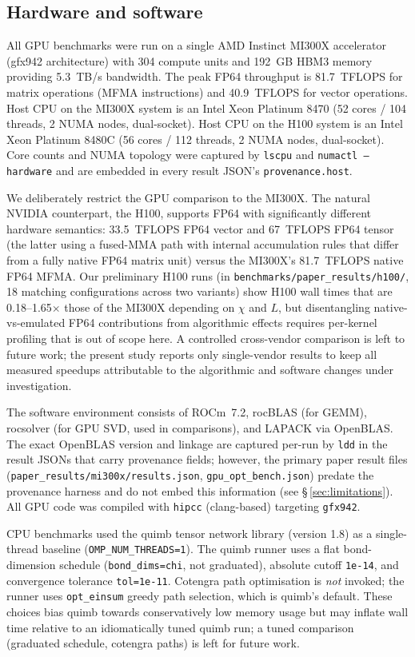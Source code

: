\documentclass[preprint,12pt]{elsarticle}
\begin{document}
\subsection{Hardware and software}
\label{sec:hardware}

All GPU benchmarks were run on a single AMD Instinct MI300X accelerator (gfx942 architecture) with 304 compute units and 192~GB HBM3 memory providing 5.3~TB/s bandwidth.
The peak FP64 throughput is 81.7~TFLOPS for matrix operations (MFMA instructions) and 40.9~TFLOPS for vector operations.
Host CPU on the MI300X system is an Intel Xeon Platinum 8470 (52 cores / 104 threads, 2 NUMA nodes, dual-socket). Host CPU on the H100 system is an Intel Xeon Platinum 8480C (56 cores / 112 threads, 2 NUMA nodes, dual-socket). Core counts and NUMA topology were captured by \texttt{lscpu} and \texttt{numactl --hardware} and are embedded in every result JSON's \texttt{provenance.host}.

We deliberately restrict the GPU comparison to the MI300X.
The natural NVIDIA counterpart, the H100, supports FP64 with significantly different hardware semantics: 33.5~TFLOPS FP64 vector and 67~TFLOPS FP64 tensor (the latter using a fused-MMA path with internal accumulation rules that differ from a fully native FP64 matrix unit) versus the MI300X's 81.7~TFLOPS native FP64 MFMA.
Our preliminary H100 runs (in \texttt{benchmarks/paper\_results/h100/}, 18 matching configurations across two variants) show H100 wall times that are 0.18--1.65$\times$ those of the MI300X depending on $\chi$ and $L$, but disentangling native-vs-emulated FP64 contributions from algorithmic effects requires per-kernel profiling that is out of scope here.
A controlled cross-vendor comparison is left to future work; the present study reports only single-vendor results to keep all measured speedups attributable to the algorithmic and software changes under investigation.

The software environment consists of ROCm~7.2, rocBLAS (for GEMM), rocsolver (for GPU SVD, used in comparisons), and LAPACK via OpenBLAS.
The exact OpenBLAS version and linkage are captured per-run by \texttt{ldd} in the result JSONs that carry provenance fields; however, the primary paper result files (\texttt{paper\_results/mi300x/results.json}, \texttt{gpu\_opt\_bench.json}) predate the provenance harness and do not embed this information (see \S\,\ref{sec:limitations}).
All GPU code was compiled with \texttt{hipcc} (clang-based) targeting \texttt{gfx942}.

CPU benchmarks used the quimb tensor network library \cite{Gray2018} (version 1.8) as a single-thread baseline (\texttt{OMP\_NUM\_THREADS=1}).
The quimb runner uses a flat bond-dimension schedule (\texttt{bond\_dims=chi}, not graduated), absolute cutoff \texttt{1e-14}, and convergence tolerance \texttt{tol=1e-11}.
Cotengra path optimisation is \emph{not} invoked; the runner uses \texttt{opt\_einsum} greedy path selection, which is quimb's default.
These choices bias quimb towards conservatively low memory usage but may inflate wall time relative to an idiomatically tuned quimb run; a tuned comparison (graduated schedule, cotengra paths) is left for future work.
\end{document}
